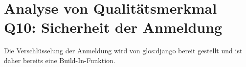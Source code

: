 
\section{Analyse von Qualitätsmerkmal Q10: Sicherheit der Anmeldung}
Die Verschlüsselung der Anmeldung wird von \gls{glos:django} bereit gestellt und ist daher
bereits eine Build-In-Funktion. 
